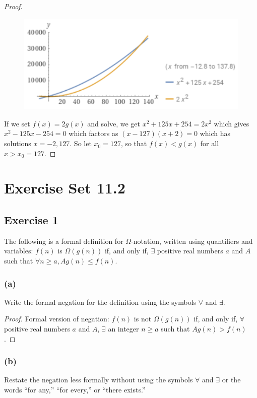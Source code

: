 \documentclass[14pt]{extarticle}
\newcommand{\fa}{\forall}
\newcommand{\te}{\exists}
\begin{document}
\begin{proof}
\begin{figure}[ht!]
\centering
\includegraphics[scale=0.5]{../images/11.1.28.png}
\end{figure}

If we set \(f(x) = 2g(x)\) and solve, we get \(x^2 + 125x + 254 = 2x^2\) which gives \(x^2 - 125x - 254 = 0\) which 
factors as \((x-127)(x+2) = 0\) which has solutions \(x = -2, 127\). So let \(x_0 = 127\), so that \(f(x) < g(x)\) for all
\(x > x_0 = 127\).
\end{proof}

\section{Exercise Set 11.2}

\subsection{Exercise 1}
The following is a formal definition for \(\Omega\)-notation, written using quantifiers and variables: \(f(n)\) is \(\Omega 
(g(n))\) if, and only if, \(\te\) positive real numbers \(a\) and \(A\) such that \(\fa n \geq a, Ag(n) \leq f(n)\).

\subsubsection{(a)}
Write the formal negation for the definition using the symbols \(\fa\) and \(\te\).

\begin{proof}
Formal version of negation: \(f(n)\) is not \(\Omega(g(n))\) if, and only if, \(\fa\) positive real numbers \(a\) and 
\(A\), \(\te\) an integer \(n \geq a\) such that \(Ag(n) > f(n)\).
\end{proof}

\subsubsection{(b)}
Restate the negation less formally without using the symbols \(\fa\) and \(\te\) or the words “for any,” “for every,” or 
“there exists.”
\end{document}
